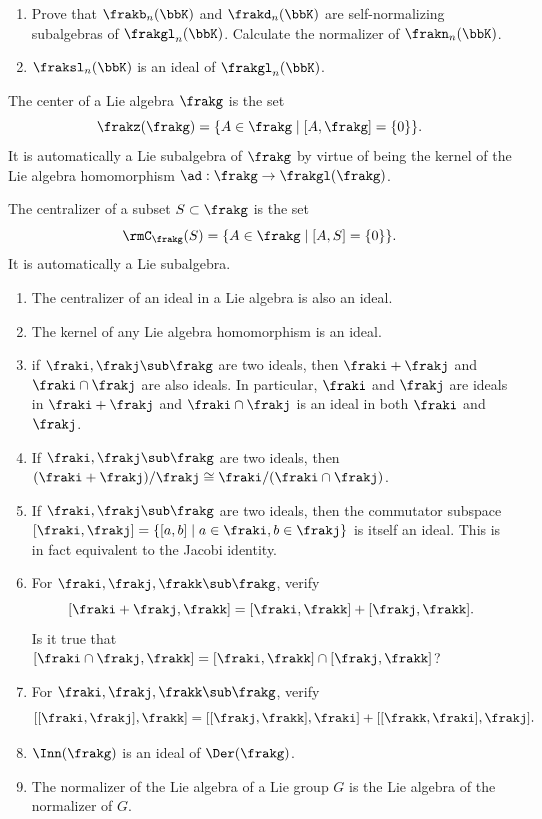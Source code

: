 \begin{xca}
    \begin{enumerate}
         \item Prove that $\frakb_n(\bbK)$ and $\frakd_n(\bbK)$ are self-normalizing subalgebras of $\frakgl_n(\bbK)$. Calculate the normalizer of $\frakn_n(\bbK)$.
         \item $\fraksl_n(\bbK)$ is an ideal of $\frakgl_n(\bbK)$.
    \end{enumerate}
\end{xca}

\begin{defn}
    The center of a Lie algebra $\frakg$ is the set
    \[\frakz(\frakg)=\{A\in\frakg\mid [A,\frakg]=\{0\}\}.\]
    It is automatically a Lie subalgebra of $\frakg$ by virtue of being the kernel of the Lie algebra homomorphism $\ad:\frakg\to \frakgl(\frakg)$.
\end{defn}

\begin{defn}[Centralizer]
    The centralizer of a subset $S\subset\frakg$ is the set
    \[\rmC_\frakg(S)=\{A\in\frakg\mid [A,S]=\{0\}\}.\]
    It is automatically a Lie subalgebra.
\end{defn}

\begin{xca}\label{xca ideals}
\begin{enumerate}
    \item The centralizer of an ideal in a Lie algebra is also an ideal.
    \item The kernel of any Lie algebra homomorphism is an ideal.
    \item if $\fraki,\frakj\sub\frakg$ are two ideals, then $\fraki+\frakj$ and $\fraki\cap \frakj$ are also ideals. In particular, $\fraki$ and $\frakj$ are ideals in $\fraki+\frakj$ and $\fraki\cap \frakj$ is an ideal in both $\fraki$ and $\frakj$.
    \item If $\fraki,\frakj\sub \frakg$ are two ideals, then $(\fraki+\frakj)\slash \frakj\cong \fraki\slash(\fraki\cap \frakj)$.
    \item If $\fraki,\frakj\sub \frakg$ are two ideals, then the commutator subspace $[\fraki,\frakj]=\{[a,b]\mid a\in \fraki,b\in \frakj\}$ is itself an ideal. This is in fact equivalent to the Jacobi identity.
    \item For $\fraki,\frakj,\frakk\sub \frakg$, verify
    \[[\fraki+\frakj,\frakk]=[\fraki,\frakk]+[\frakj,\frakk].\]
    Is it true that $[\fraki\cap \frakj,\frakk]=[\fraki,\frakk]\cap [\frakj,\frakk]$?
    \item For $\fraki,\frakj,\frakk\sub \frakg$, verify
    \[[[\fraki,\frakj],\frakk]=[[\frakj,\frakk],\fraki]+[[\frakk,\fraki],\frakj].\]
    \item $\Inn(\frakg)$ is an ideal of $\Der(\frakg)$.
    \item The normalizer of the Lie algebra of a Lie group $G$ is the Lie algebra of the normalizer of $G$.
\end{enumerate}
\end{xca}


